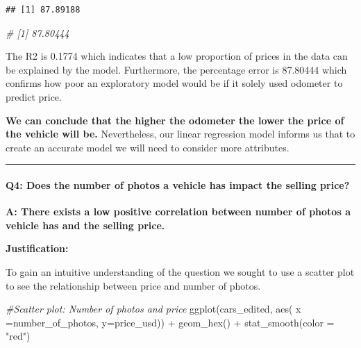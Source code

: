 \documentclass[
]{article}
\newenvironment{Shaded}{\begin{snugshade}}{\end{snugshade}}
\newcommand{\AttributeTok}[1]{\textcolor[rgb]{0.77,0.63,0.00}{#1}}
\newcommand{\CommentTok}[1]{\textcolor[rgb]{0.56,0.35,0.01}{\textit{#1}}}
\newcommand{\FunctionTok}[1]{\textcolor[rgb]{0.00,0.00,0.00}{#1}}
\newcommand{\NormalTok}[1]{#1}
\newcommand{\SpecialCharTok}[1]{\textcolor[rgb]{0.00,0.00,0.00}{#1}}
\newcommand{\StringTok}[1]{\textcolor[rgb]{0.31,0.60,0.02}{#1}}
\begin{document}
\begin{verbatim}
## [1] 87.89188
\end{verbatim}

\begin{Shaded}
\begin{Highlighting}[]
\CommentTok{\# [1] 87.80444}
\end{Highlighting}
\end{Shaded}

The R2 is 0.1774 which indicates that a low proportion of prices in the
data can be explained by the model. Furthermore, the percentage error is
87.80444 which confirms how poor an exploratory model would be if it
solely used odometer to predict price.

\textbf{We can conclude that the higher the odometer the lower the price
of the vehicle will be.} Nevertheless, our linear regression model
informs us that to create an accurate model we will need to consider
more attributes.

\begin{center}\rule{0.5\linewidth}{0.5pt}\end{center}

\hypertarget{q4-does-the-number-of-photos-a-vehicle-has-impact-the-selling-price}{%
\paragraph{\texorpdfstring{\textbf{Q4:} Does the number of photos a
vehicle has impact the selling
price?}{Q4: Does the number of photos a vehicle has impact the selling price?}}\label{q4-does-the-number-of-photos-a-vehicle-has-impact-the-selling-price}}

\textbf{A: There exists a low positive correlation between number of
photos a vehicle has and the selling price.}

\textbf{Justification:}

To gain an intuitive understanding of the question we sought to use a
scatter plot to see the relationship between price and number of photos.

\begin{Shaded}
\begin{Highlighting}[]
\CommentTok{\#Scatter plot: Number of photos and price}
\FunctionTok{ggplot}\NormalTok{(cars\_edited, }\FunctionTok{aes}\NormalTok{( }\AttributeTok{x =}\NormalTok{number\_of\_photos, }\AttributeTok{y=}\NormalTok{price\_usd)) }\SpecialCharTok{+} \FunctionTok{geom\_hex}\NormalTok{() }\SpecialCharTok{+} \FunctionTok{stat\_smooth}\NormalTok{(}\AttributeTok{color =} \StringTok{"red"}\NormalTok{) }
\end{Highlighting}
\end{Shaded}
\end{document}

